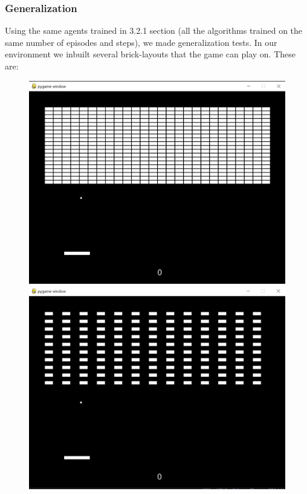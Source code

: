 \documentclass[twoside,11pt]{article}
\begin{document}
\subsubsection{Generalization}
Using the same agents trained in 3.2.1 section (all the algorithms trained on the same number of episodes and steps), we made generalization tests. In our environment we inbuilt several brick-layouts  that the game can play on. These are:
\begin{figure}[H]
\includegraphics[scale=0.2]{layout0}
\includegraphics[scale=0.2]{layout1}

\end{figure}
\end{document}
